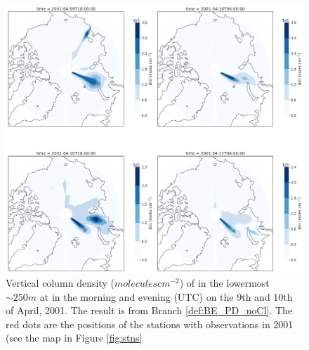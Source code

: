 \begin{figure}[ht]
    \centering
    \includegraphics[width = \linewidth]{Chapter6_Results/images/polarBrO_noCl.png}
    \caption{Vertical column density ($molecules cm^{-2}$) of  in the lowermost $\sim 250 m$ at in the morning and evening (UTC) on the 9th and 10th of April, 2001. The result is from Branch \ref{def:BE_PD_noCl}. The red dots are the positions of the stations with observations in 2001 (see the map in Figure \ref{fig:stns}}
    \label{fig:polarBrO_noCl}
\end{figure}